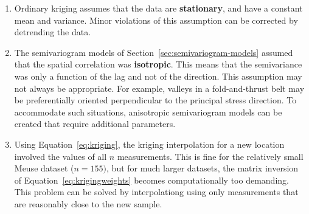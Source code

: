\begin{enumerate}
\item Ordinary kriging assumes that the data are \textbf{stationary},
  and have a constant mean and variance. Minor violations of this
  assumption can be corrected by detrending the data.
\item The semivariogram models of
  Section~\ref{sec:semivariogram-models} assumed that the spatial
  correlation was \textbf{isotropic}. This means that the semivariance
  was only a function of the lag and not of the direction. This
  assumption may not always be appropriate. For example, valleys in a
  fold-and-thrust belt may be preferentially oriented perpendicular to
  the principal stress direction. To accommodate such situations,
  anisotropic semivariogram models can be created that require
  additional parameters.
\item Using Equation~\ref{eq:kriging}, the kriging interpolation for a
  new location involved the values of all $n$ measurements.  This is
  fine for the relatively small Meuse dataset ($n=155)$, but for much
  larger datasets, the matrix inversion of
  Equation~\ref{eq:krigingweights} becomes computationally too
  demanding.  This problem can be solved by interpolationg using only
  measurements that are reasonably close to the new sample.
\end{enumerate}

